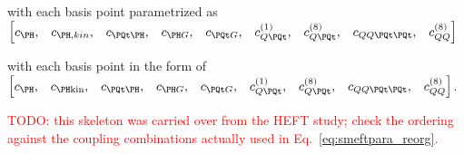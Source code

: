 with each basis point parametrized as $\begin{bmatrix} c_\PH, &  c_{\PH,kin}, &  c_{\PQt\PH}, & c_{\PH G}, & c_{\PQt G}, & c_{Q\PQt}^{(1)}, & c_{Q \PQt}^{(8)}, & c_{QQ\PQt\PQt}, & c_{QQ}^{(8)} \end{bmatrix}$

with each basis point in the form of $\begin{bmatrix} c_\PH, & c_{\PH \mathrm{kin}}, & c_{\PQt\PH}, & c_{\PH G}, & c_{\PQt G}, & c_{Q\PQt}^{(1)}, & c_{Q\PQt}^{(8)}, & c_{QQ\PQt\PQt}, & c_{QQ}^{(8)} \end{bmatrix}$.

\textcolor{red}{TODO: this skeleton was carried over from the HEFT study; check the ordering against the coupling combinations actually used in Eq.~\eqref{eq:smeftpara_reorg}.}
